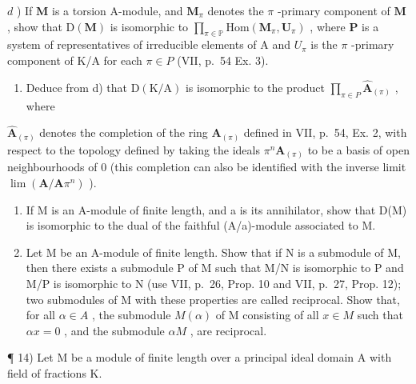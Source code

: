 \(d\) ) If \(\mathbf{M}\) is a torsion A-module, and \(\mathbf{M}_{\pi}\) denotes the \(\pi\) -primary component of \(\mathbf{M}\) , show that \(\mathrm{D}(\mathbf{M})\) is isomorphic to \(\prod_{\pi \in \mathbb{P}}\mathrm{Hom}(\mathbf{M}_{\pi},\mathbf{U}_{\pi})\) , where \(\mathbf{P}\) is a system of representatives of irreducible elements of A and \(U_{\pi}\) is the \(\pi\) -primary component of K/A for each \(\pi \in P\) (VII, p.~54 Ex. 3).

\begin{enumerate}
\def\labelenumi{\alph{enumi})}
\setcounter{enumi}{4}
\tightlist
\item
  Deduce from d) that \(\mathrm{D}(\mathrm{K}/\mathrm{A})\) is isomorphic to the product \(\prod_{\pi\in P}\hat{\mathbf{A}}_{(\pi)}\) , where
\end{enumerate}

\(\hat{\mathbf{A}}_{(\pi)}\) denotes the completion of the ring \(\mathbf{A}_{(\pi)}\) defined in VII, p.~54, Ex. 2, with respect to the topology defined by taking the ideals \(\pi^n\mathbf{A}_{(\pi)}\) to be a basis of open neighbourhoods of 0 (this completion can also be identified with the inverse limit \(\lim (\mathbf{A} / \mathbf{A}\pi^n)\) ).

\begin{enumerate}
\def\labelenumi{\alph{enumi})}
\setcounter{enumi}{5}
\item
  If M is an A-module of finite length, and a is its annihilator, show that D(M) is isomorphic to the dual of the faithful (A/a)-module associated to M.
\item
  Let M be an A-module of finite length. Show that if N is a submodule of M, then there exists a submodule P of M such that M/N is isomorphic to P and M/P is isomorphic to N (use VII, p.~26, Prop. 10 and VII, p.~27, Prop. 12); two submodules of M with these properties are called reciprocal. Show that, for all \(\alpha \in A\) , the submodule \(M(\alpha)\) of M consisting of all \(x \in M\) such that \(\alpha x = 0\) , and the submodule \(\alpha M\) , are reciprocal.
\end{enumerate}

¶ 14) Let M be a module of finite length over a principal ideal domain A with field of fractions K.

